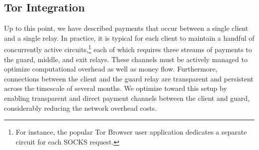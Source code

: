 \subsection{Tor Integration}

Up to this point, we have described payments that occur between a single client
and a single relay. In practice, it is typical for each client to maintain a
handful of concurrently active circuits,\footnote{For instance, the popular Tor
  Browser user application dedicates a separate circuit for each SOCKS request.}  each of
which requires three streams of payments to the guard, middle, and exit
relays. These channels must be actively managed to optimize computational
overhead as well as money flow. Furthermore, connections between the client and
the guard relay are transparent and persistent across the timescale of several
months. We optimize toward this setup by enabling transparent and direct payment
channels between the client and guard, considerably reducing the network
overhead costs.